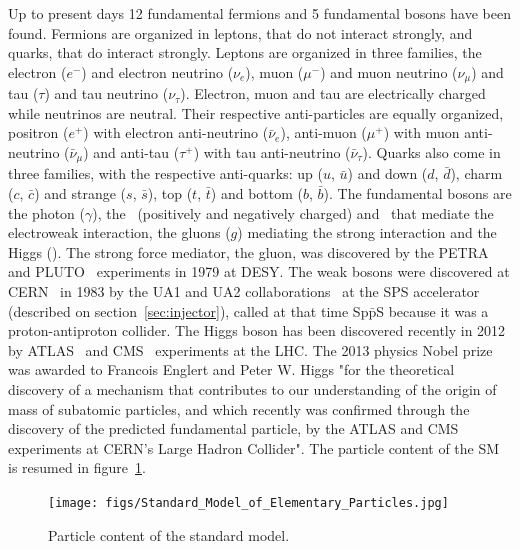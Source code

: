 Up to present days 12 fundamental fermions and 5 fundamental bosons have been found. Fermions are organized in leptons, that do not interact strongly, and quarks, that do interact strongly. Leptons are organized in three families, the electron ($e^{-}$) and electron neutrino ($\nu_{e}$), muon ($\mu^{-}$) and muon neutrino ($\nu_{\mu}$) and tau ($\tau$) and tau neutrino ($\nu_{\tau}$). Electron, muon and tau are electrically charged while neutrinos are neutral. Their respective anti-particles are equally organized, positron ($e^{+}$) with electron anti-neutrino ($\bar{\nu}_{e}$), anti-muon ($\mu^{+}$) with muon anti-neutrino ($\bar{\nu}_{\mu}$) and anti-tau ($\tau^{+}$) with tau anti-neutrino ($\bar{\nu}_{\tau}$). Quarks also come in three families, with the respective anti-quarks: up ($u$, $\bar{u}$) and down ($d$, $\bar{d}$), charm ($c$, $\bar{c}$) and strange ($s$, $\bar{s}$), top ($t$, $\bar{t}$) and bottom ($b$, $\bar{b}$). The fundamental bosons are the photon ($\gamma$), the \W~(positively and negatively charged) and \Z~that mediate the electroweak interaction, the gluons ($g$) mediating the strong interaction and the Higgs (\Hb). The strong force mediator, the gluon, was discovered by the PETRA~\cite{Soding:2010} and PLUTO~\cite{Stella:2010ne} experiments in 1979 at DESY. The weak bosons were discovered at CERN~\cite{1742-6596-623-1-012028} in 1983 by the UA1 and UA2 collaborations~\cite{Hansen:1984mw} at the SPS accelerator~\cite{SPS:REF} (described on section~\ref{sec:injector}), called at that time Sp$\bar{\text{p}}$S because it was a proton-antiproton collider. The Higgs boson has been discovered recently in 2012 by ATLAS~\cite{1748-0221-3-08-S08003} and CMS~\cite{1748-0221-3-08-S08004} experiments at the LHC. The 2013 physics Nobel prize~\cite{Nobel2013} was awarded to Francois Englert and Peter W. Higgs "for the theoretical discovery of a mechanism that contributes to our understanding of the origin of mass of subatomic particles, and which recently was confirmed through the discovery of the predicted fundamental particle, by the ATLAS and CMS experiments at CERN's Large Hadron Collider". The particle content of the SM is resumed in figure~\ref{fig:SMContent}.

\begin{figure}[!Hhtbp]
  \begin{center}
    \texttt{[image: figs/Standard\_Model\_of\_Elementary\_Particles.jpg]}
    \caption{Particle content of the standard model.}
    \label{fig:SMContent}
  \end{center}
\end{figure}

